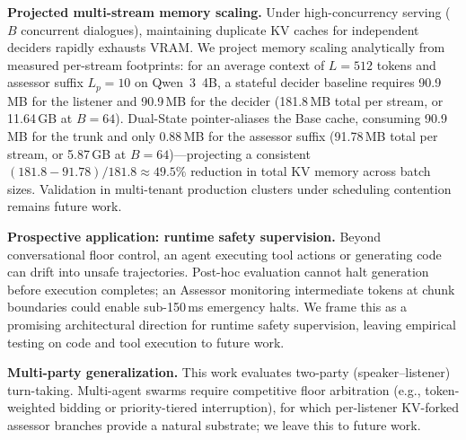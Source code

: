 \documentclass{article}
\begin{document}
\textbf{Projected multi-stream memory scaling.} Under high-concurrency serving ($B$ concurrent dialogues), maintaining duplicate KV caches for independent deciders rapidly exhausts VRAM. We project memory scaling analytically from measured per-stream footprints: for an average context of $L = 512$ tokens and assessor suffix $L_p = 10$ on Qwen~3~4B, a stateful decider baseline requires 90.9\,MB for the listener and 90.9\,MB for the decider (181.8\,MB total per stream, or 11.64\,GB at $B=64$). Dual-State pointer-aliases the Base cache, consuming 90.9\,MB for the trunk and only 0.88\,MB for the assessor suffix (91.78\,MB total per stream, or 5.87\,GB at $B=64$)---projecting a consistent $(181.8 - 91.78)/181.8 \approx \mathbf{49.5\%}$ reduction in total KV memory across batch sizes. Validation in multi-tenant production clusters under scheduling contention remains future work.

\textbf{Prospective application: runtime safety supervision.} Beyond conversational floor control, an agent executing tool actions or generating code can drift into unsafe trajectories. Post-hoc evaluation cannot halt generation before execution completes; an Assessor monitoring intermediate tokens at chunk boundaries could enable sub-150\,ms emergency halts. We frame this as a promising architectural direction for runtime safety supervision, leaving empirical testing on code and tool execution to future work.

\textbf{Multi-party generalization.} This work evaluates two-party (speaker--listener) turn-taking. Multi-agent swarms require competitive floor arbitration (e.g., token-weighted bidding or priority-tiered interruption), for which per-listener KV-forked assessor branches provide a natural substrate; we leave this to future work.
\end{document}
